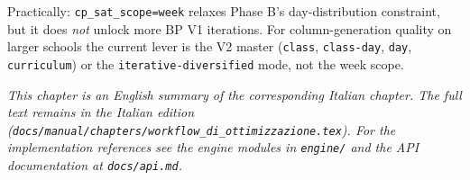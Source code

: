Practically: \texttt{cp\_sat\_scope=week} relaxes Phase B's day-distribution constraint, but it does \emph{not} unlock more BP V1 iterations. For column-generation quality on larger schools the current lever is the V2 master (\texttt{class}, \texttt{class-day}, \texttt{day}, \texttt{curriculum}) or the \texttt{iterative-diversified} mode, not the week scope.

\medskip
\noindent
\textit{This chapter is an English summary of the corresponding Italian chapter. The full text remains in the Italian edition (\texttt{docs/manual/chapters/workflow\_di\_ottimizzazione.tex}). For the implementation references see the engine modules in \texttt{engine/} and the API documentation at \texttt{docs/api.md}.}
